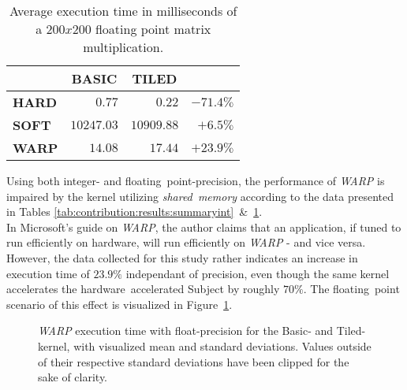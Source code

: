 \documentclass[fleqn,10pt]{SelfArx} %
\begin{document}
\begin{table}[hbt]
\begin{center}
\begin{tabular}{r|r|r|r|}
	\cline{2-3}
							& \multicolumn{1}{|c|}{\textbf{BASIC}} & \multicolumn{1}{|c|}{\textbf{TILED}}	\\ \hline
	\multicolumn{1}{|l|}{\textbf{HARD}}	& $0.77$			& $0.22$		& $-71.4\%$    				\\ \hline
	\multicolumn{1}{|l|}{\textbf{SOFT}}	& $10247.03$		& $10909.88$	& $+6.5\%$     				\\ \hline
	\multicolumn{1}{|l|}{\textbf{WARP}}	& $14.08$			& $17.44$		& $+23.9\%$    				\\ \hline
\end{tabular}
\end{center}
\caption{Average execution time in milliseconds of a $200x200$ floating point matrix multiplication.}
\label{tab:contribution:results:summaryfloat}
\end{table}

\noindent
Using both integer- and floating~point-precision, the performance of \textit{WARP} is impaired by the kernel utilizing \textit{shared~memory} according to the data presented in Tables \ref{tab:contribution:results:summaryint}~\&~\ref{tab:contribution:results:summaryfloat}.\\
In Microsoft's guide on \textit{WARP}, the author claims that an application, if tuned to run efficiently on hardware, will run efficiently on \textit{WARP} - and vice versa. However, the data collected for this study rather indicates an increase in execution time of $23.9\%$ independant of precision, even though the same kernel accelerates the hardware~accelerated Subject by roughly $70\%$. The floating~point scenario of this effect is visualized in Figure~\ref{fig:contribution:results:warp:msswarp}.

\begin{figure}[htb]
\begin{center}
	\resizebox{ \columnwidth }{!}{}
	\caption{\textit{WARP} execution time with float-precision for the Basic- and Tiled-kernel, with visualized mean and standard deviations. Values outside of their respective standard deviations have been clipped for the sake of clarity.}
	\label{fig:contribution:results:warp:msswarp}
\end{center}
\end{figure}
\end{document}
